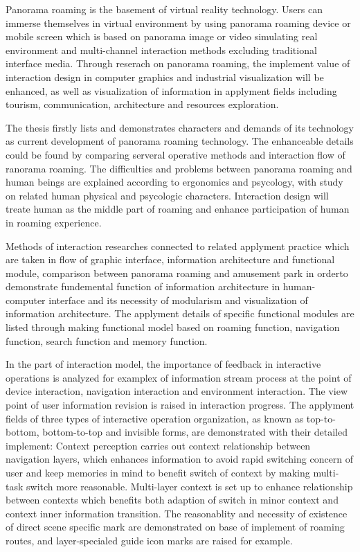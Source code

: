 \begin{enabstract}
\begin{spacing}{1.0}
\xiaosi
\setlength{\baselineskip}{20pt}
Panorama roaming is the basement of virtual reality technology. Users can immerse themselves in virtual environment by using panorama roaming device or mobile screen which is based on panorama image or video simulating real environment and multi-channel interaction methods excluding traditional interface media. Through reserach on panorama roaming, the implement value of interaction design in computer graphics and industrial visualization will be enhanced, as well as visualization of information in applyment fields including tourism, communication, architecture and resources exploration.

The thesis firstly lists and demonstrates characters and demands of its technology as current development of panorama roaming technology. The enhanceable details could be found by comparing serveral operative methods and interaction flow of ranorama roaming. The difficulties and problems between panorama roaming and human beings are explained according to ergonomics and psycology, with study on related human physical and psycologic characters. Interaction design will treate human as the middle part of roaming and enhance participation of human in roaming experience.

Methods of interaction researches connected to related applyment practice which are taken in flow of graphic interface, information architecture and functional module, comparison between panorama roaming and amusement park in orderto demonstrate fundemental function 
of information architecture in human-computer interface and its necessity of modularism and visualization of information architecture. The applyment details of specific functional modules are listed through making functional model based on roaming function, navigation function, search function and memory function.

In the part of interaction model, the importance of feedback in interactive operations is analyzed for examplex of information stream process at the point of device interaction, navigation interaction and environment interaction. The view point of user information revision is raised in interaction progress. The applyment fields of three types of interactive operation organization, as known as top-to-bottom, bottom-to-top and invisible forms, are demonstrated with their detailed implement: Context perception carries out context relationship between navigation layers, which enhances information to avoid rapid switching concern of user and keep memories in mind to benefit switch of context by making multi-task switch more reasonable. Multi-layer context is set up to enhance relationship between contexts which benefits both adaption of switch in minor context and context inner information transition. The reasonablity and necessity of existence of direct scene specific mark are demonstrated on base of implement of roaming routes, and layer-specialed guide icon marks are raised for example.


\end{spacing}
\end{enabstract}
